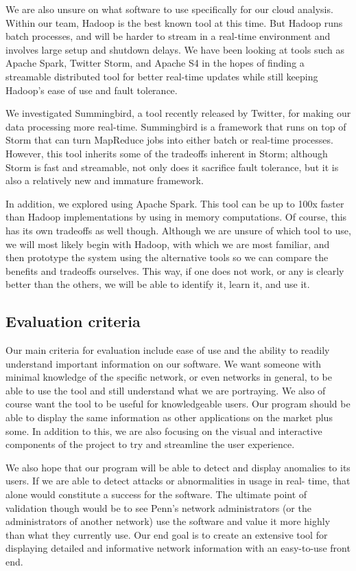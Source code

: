 \documentclass{sig-alternate}
\begin{document}
We are also unsure on what software to use specifically for our cloud analysis.
Within our team, Hadoop is the best known tool at this time. But Hadoop runs
batch processes, and will be harder to stream in a real-time environment and
involves large setup and shutdown delays. We have been looking at tools such as
Apache Spark, Twitter Storm, and Apache S4 in the hopes of finding a streamable
distributed tool for better real-time updates while still keeping Hadoop's ease
of use and fault tolerance.

We investigated Summingbird, a tool recently released by Twitter, for making our
data processing more real-time. Summingbird is a framework that runs on top of
Storm that can turn MapReduce jobs into either batch or real-time processes.
However, this tool inherits some of the tradeoffs inherent in Storm; although
Storm is fast and streamable, not only does it sacrifice fault tolerance, but it
is also a relatively new and immature framework.\cite{TwitterSummingbird}

In addition, we explored using Apache Spark. This tool can be up to 100x faster
than Hadoop implementations by using in memory computations. Of course, this has
its own tradeoffs as well though.\cite{ApacheSpark} Although we are unsure of
which tool to use, we will most likely begin with Hadoop, with which we are most
familiar, and then prototype the system using the alternative tools so we can
compare the benefits and tradeoffs ourselves. This way, if one does not work, or
any is clearly better than the others, we will be able to identify it, learn it,
and use it.

\subsection{Evaluation criteria}

Our main criteria for evaluation include ease of use and the ability to readily
understand important information on our software. We want someone with minimal
knowledge of the specific network, or even networks in general, to be able to
use the tool and still understand what we are portraying. We also of course want
the tool to be useful for knowledgeable users. Our program should be able to
display the same information as other applications on the market plus some. In
addition to this, we are also focusing on the visual and interactive components
of the project to try and streamline the user experience.

We also hope that our program will be able to detect and display anomalies to
its users. If we are able to detect attacks or abnormalities in usage in real-
time, that alone would constitute a success for the software. The ultimate point
of validation though would be to see Penn's network administrators (or the
administrators of another network) use the software and value it more highly
than what they currently use. Our end goal is to create an extensive tool for
displaying detailed and informative network information with an easy-to-use
front end.
\end{document}
